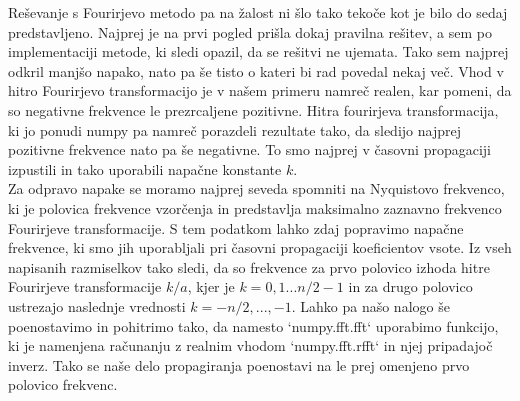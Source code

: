 \documentclass{article}
\begin{document}
\medskip

Reševanje s Fourirjevo metodo pa na žalost ni šlo tako tekoče kot je bilo do sedaj predstavljeno. Najprej je na prvi pogled prišla dokaj pravilna rešitev, a sem po implementaciji metode, ki sledi opazil, da se rešitvi ne ujemata. Tako sem najprej odkril manjšo napako, nato pa še tisto o kateri bi rad povedal nekaj več. Vhod v hitro Fourirjevo transformacijo je v našem primeru namreč realen, kar pomeni, da so negativne frekvence le prezrcaljene pozitivne. Hitra fourirjeva transformacija, ki jo ponudi numpy pa namreč porazdeli rezultate tako, da sledijo najprej pozitivne frekvence nato pa še negativne. To smo najprej v časovni propagaciji izpustili in tako uporabili napačne konstante $k$. \\
Za odpravo napake se moramo najprej seveda spomniti na Nyquistovo frekvenco, ki je polovica frekvence vzorčenja in predstavlja maksimalno zaznavno frekvenco Fourirjeve transformacije. S tem podatkom lahko zdaj popravimo napačne frekvence, ki smo jih uporabljali pri časovni propagaciji koeficientov vsote. Iz vseh napisanih razmiselkov tako sledi, da so frekvence za prvo polovico izhoda hitre Fourirjeve transformacije $k/a$, kjer je $k=0,1...n/2-1$ in za drugo polovico ustrezajo naslednje vrednosti $k=-n/2,...,-1$. Lahko pa našo nalogo še poenostavimo in pohitrimo tako, da namesto `numpy.fft.fft` uporabimo funkcijo, ki je namenjena računanju z realnim vhodom `numpy.fft.rfft` in njej pripadajoč inverz. Tako se naše delo propagiranja poenostavi na le prej omenjeno prvo polovico frekvenc.
\end{document}
